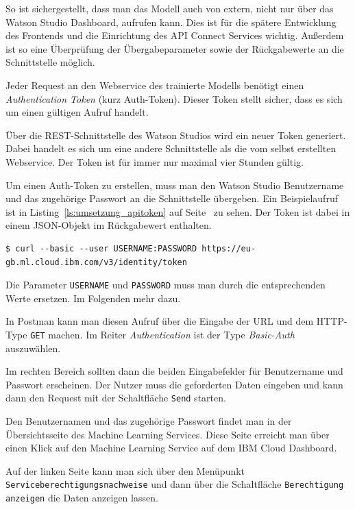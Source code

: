 So ist sichergestellt, dass man das Modell auch von extern, nicht nur über das Watson Studio Dashboard, aufrufen kann.
Dies ist für die spätere Entwicklung des Frontends und die Einrichtung des API Connect Services wichtig. Außerdem ist
so eine Überprüfung der Übergabeparameter sowie der Rückgabewerte an die Schnittstelle möglich.

Jeder Request an den Webservice des trainierte Modells benötigt einen \textit{Authentication Token} (kurz Auth-Token).
Dieser Token stellt sicher, dass es sich um einen gültigen Aufruf handelt.

Über die REST-Schnittstelle des Watson Studios wird ein neuer Token generiert. Dabei handelt es sich um eine andere
Schnittstelle als die vom selbst erstellten Webservice. Der Token ist für immer nur maximal vier Stunden gültig.

Um einen Auth-Token zu erstellen, muss man den Watson Studio Benutzername und das zugehörige Passwort an die
Schnittstelle übergeben. Ein Beispielaufruf ist in Listing~\ref{ls:umsetzung_apitoken} auf
Seite~\pageref{ls:umsetzung_apitoken} zu sehen. Der Token ist dabei in einem JSON-Objekt im Rückgabewert enthalten.

\begin{lstlisting}[caption=Abruf des Auth-Tokens, label=ls:umsetzung_apitoken]
$ curl --basic --user USERNAME:PASSWORD https://eu-gb.ml.cloud.ibm.com/v3/identity/token
\end{lstlisting}

Die Parameter \texttt{USERNAME} und \texttt{PASSWORD} muss man durch die entsprechenden Werte ersetzen. Im Folgenden
mehr dazu.

In Postman kann man diesen Aufruf über die Eingabe der URL und dem HTTP-Type \texttt{GET} machen. Im Reiter
\textit{Authentication} ist der Type \textit{Basic-Auth} auszuwählen.

Im rechten Bereich sollten dann die beiden Eingabefelder für Benutzername und Passwort erscheinen. Der Nutzer muss die
geforderten Daten eingeben und kann dann den Request mit der Schaltfläche \texttt{Send} starten.

Den Benutzernamen und das zugehörige Passwort findet man in der Übersichtsseite des Machine Learning Services. Diese
Seite erreicht man über einen Klick auf den Machine Learning Service auf dem IBM Cloud Dashboard.

Auf der linken Seite kann man sich über den Menüpunkt \texttt{Service\-berechtigungs\-nachweise} und dann über die
Schaltfläche \texttt{Berechtigung anzeigen} die Daten anzeigen lassen.

